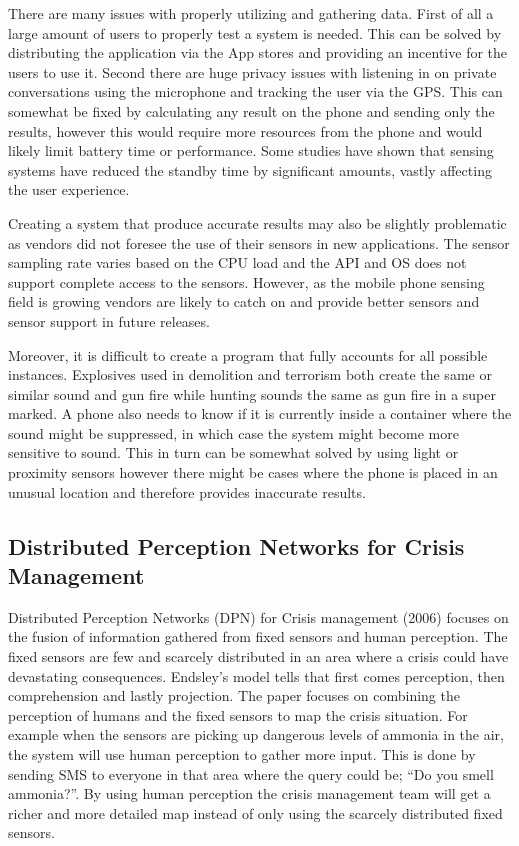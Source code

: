 There are many issues with properly utilizing and gathering data. First of all a large amount of users to properly test a system is needed. This can be solved by distributing the application via the App stores and providing an incentive for the users to use it. Second there are huge privacy issues with listening in on private conversations using the microphone and tracking the user via the GPS. This can somewhat be fixed by calculating any result on the phone and sending only the results, however this would require more resources from the phone and would likely limit battery time or performance. Some studies have shown that sensing systems have reduced the standby time by significant amounts, vastly affecting the user experience.

Creating a system that produce accurate results may also be slightly problematic as vendors did not foresee the use of their sensors in new applications. The sensor sampling rate varies based on the CPU load and the API and OS does not support complete access to the sensors. However, as the mobile phone sensing field is growing vendors are likely to catch on and provide better sensors and sensor support in future releases.

Moreover, it is difficult to create a program that fully accounts for all possible instances. Explosives used in demolition and terrorism both create the same or similar sound and gun fire while hunting sounds the same as gun fire in a super marked. A phone also needs to know if it is currently inside a container where the sound might be suppressed, in which case the system might become more sensitive to sound. This in turn can be somewhat solved by using light or proximity sensors however there might be cases where the phone is placed in an unusual location and therefore provides inaccurate results.

\subsection{Distributed Perception Networks for Crisis Management}

Distributed Perception Networks (DPN) for Crisis management (2006)\cite{dpn} focuses on the fusion of information gathered from fixed sensors and human perception. The fixed sensors are few and scarcely distributed in an area where a crisis could have devastating consequences. Endsley’s model tells that first comes perception, then comprehension and lastly projection. The paper focuses on combining the perception of humans and the fixed sensors to map the crisis situation. For example when the sensors are picking up dangerous levels of ammonia in the air, the system will use human perception to gather more input. This is done by sending SMS to everyone in that area where the query could be; “Do you smell ammonia?”. By using human perception the crisis management team will get a richer and more detailed map instead of only using the scarcely distributed fixed sensors.

